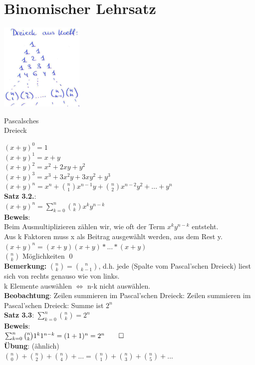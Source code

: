 \section{Binomischer Lehrsatz}
\begin{floatingfigure}[r]{6cm}
	\mbox{\includegraphics[width=0.3\textwidth]{img/pascal.PNG}}
	\caption{Pascalsches\\ Dreieck}
\end{floatingfigure}
$(x+y)^0=1$\\
$(x+y)^1 = x+y$\\
$(x+y)^2 = x^2+2xy+y^2$\\
$(x+y)^3= x^3+3x^2y+3xy^2+y^3$\medskip\\
$(x+y)^n=x^n+\binom{n}{1}x^{n-1}y+\binom{n}{2}x^{n-2}y^2+...+y^n$\medskip\\ 
\textbf{Satz 3.2.}:\\
$(x+y)^n =\sum^n_{k=0} \binom{n}{k}x^ky^{n-k}$\medskip\\
\textbf{Beweis}: \\
Beim Ausmultiplizieren zählen wir, wie oft der Term $x^ky^{n-k}$ entsteht.\\
Aus k Faktoren muss x als Beitrag ausgewählt werden, aus dem Rest y.
$(x+y)^n=(x+y)(x+y)*...*(x+y)$\\
$\binom{n}{k}$ Möglichkeiten \qed\medskip\\
\textbf{Bemerkung:} $\binom{n}{k}=\binom{n}{k-1}$, d.h. jede (Spalte vom Pascal'schen Dreieck) liest sich von rechts genauso wie von links.\\
k Elemente auswählen $\Leftrightarrow$ n-k nicht auswählen.\medskip\\
\textbf{Beobachtung}: Zeilen summieren im Pascal'schen Dreieck: Zeilen summieren im Pascal'schen Dreieck: Summe ist $2^n$\medskip\\
\textbf{Satz 3.3}: $\sum^n_{k=0} \binom{n}{k} = 2^n$\medskip\\
\textbf{Beweis}:\\
$\sum^n_{k=0}\binom{n}{k}1^k1^{n-k} = (1+1)^n=2^n\qed$\medskip\\
\textbf{Übung}: (ähnlich)\\
$\binom{n}{0}+\binom{n}{2}+\binom{n}{4}+...=\binom{n}{1}+\binom{n}{3}+\binom{n}{5}+...$\newpage
